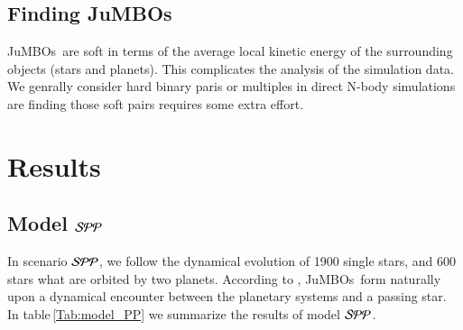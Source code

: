 \documentclass[aa]{lib/aa}
\newcommand{\jumbos}{\mbox{JuMBOs}}
\begin{document}
\subsection{Finding \jumbos}

\jumbos\, are soft in terms of the average local kinetic energy of the
surrounding objects (stars and planets). This complicates the analysis
of the simulation data. We genrally consider hard binary paris or
multiples in direct N-body simulations are finding those soft pairs
requires some extra effort.

\section{Results}

\subsection{Model ${\cal SPP}$}

In scenario ${\cal SPP}$, we follow the dynamical evolution of 1900
single stars, and 600 stars what are orbited by two planets.
According to \cite{2023arXiv231006016W}, \jumbos\, form naturally upon a
dynamical encounter between the planetary systems and a passing star.
In table\,\ref{Tab:model_PP} we summarize the results of model ${\cal
  SPP}$.
\end{document}

